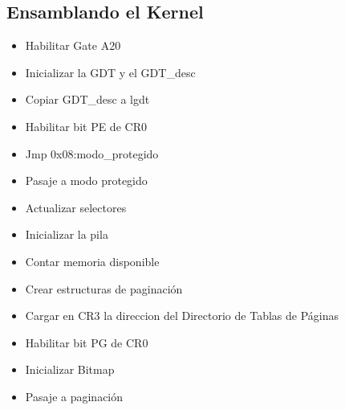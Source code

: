\documentclass[11pt, a4paper]{article}
\begin{document}
	\subsection{Ensamblando el Kernel}
	\label{kernel}	
		\begin{itemize}
			\item Habilitar Gate A20
			\item Inicializar la GDT y el GDT\_desc
			\item Copiar GDT\_desc a lgdt
			\item Habilitar bit PE de CR0
			\item Jmp 0x08:modo\_protegido
			\item Pasaje a modo protegido
			\item Actualizar selectores
			\item Inicializar la pila
			\item Contar memoria disponible
			\item Crear estructuras de paginación
			\item Cargar en CR3 la direccion del Directorio de Tablas de Páginas
			\item Habilitar bit PG de CR0
			\item Inicializar Bitmap
			\item Pasaje a paginación
		\end{itemize}
	
\end{document}
